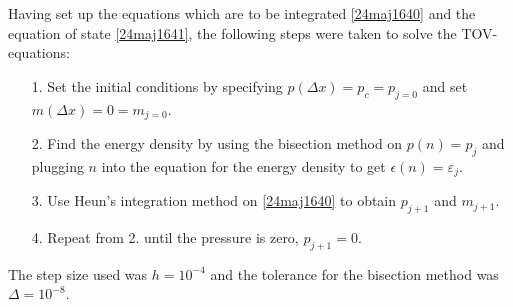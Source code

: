 \documentclass[twocolumn]{article}
\begin{document}
\begin{large}
Having set up the equations which are to be integrated \eqref{24maj1640} and the equation of state \eqref{24maj1641}, the following steps were taken to solve the TOV-equations: 
\begin{itemize}
    \item[1.] Set the initial conditions by specifying $p(\Delta x) = p_c = p_{j=0}$ and set $m(\Delta x) = 0 = m_{j=0}$.
    \item[2.] Find the energy density by using the bisection method on $p(n) = p_j$ and plugging $n$ into the equation for the energy density to get $\epsilon(n)=\varepsilon_j$. 
    \item[3.] Use Heun's integration method on \eqref{24maj1640} to obtain $p_{j+1}$ and $m_{j+1}$. 
    \item[4.] Repeat from 2. until the pressure is zero, $p_{j+1}=0$.
\end{itemize}
The step size used was $h=10^{-4}$ and the tolerance for the bisection method was $\Delta = 10^{-8}$. 


\end{large}
\end{document}
